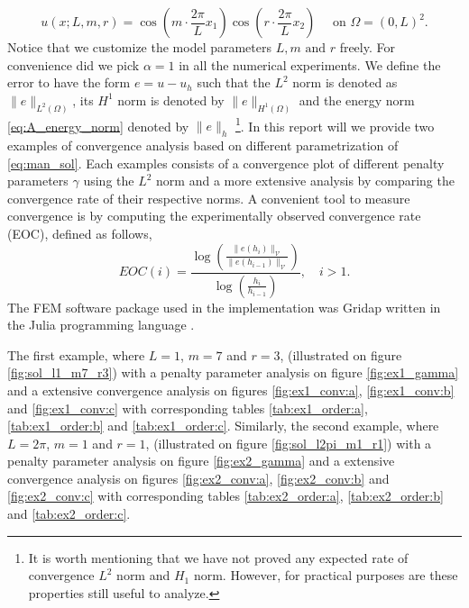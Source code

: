 \begin{equation}
    \label{eq:man_sol}
u\left( x; L,m,r \right) = \cos\left(  m\cdot \frac{2\pi}{L}  x_{1}\right)  \cos \left(r\cdot  \frac{2\pi}{L} x_{2} \right) \quad \text{ on }   \Omega =  \left( 0,L  \right)^{2}.
\end{equation}
Notice that we customize the model parameters $L, m \text{ and } r$ freely.
For convenience did we pick $\alpha = 1$ in all the numerical experiments. We define the error to have the form $e = u - u_{h}$ such that the $L^2$ norm is denoted as $\| e \|_{ L^{2}\left( \Omega  \right)   }^{  } $, its $H^{1} $ norm is denoted by $\|
e \|_{ H^{1}\left( \Omega  \right)  }^{  } $ and the energy norm  \eqref{eq:A_energy_norm} denoted by $\| e \|_{ h }^{  } $ \footnote{
It is worth mentioning that we have not proved any expected rate of convergence $L^2$ norm and $H_1$ norm. However, for practical purposes are these properties still useful to analyze.
}. In this report will we provide two examples of convergence analysis based on different
parametrization of \eqref{eq:man_sol}. Each examples consists of a convergence plot of different penalty parameters $\gamma$ using the $L^{2}$ norm and a more extensive analysis by comparing the convergence rate of their respective norms. A convenient tool to measure convergence is by computing the experimentally observed convergence rate (EOC), defined as follows,
\[
EOC(i) = \frac{\log\left( \frac{\| e\left( h_{i} \right)  \|_{ \mathcal{V}  }^{  }}{\| e\left( h_{i-1} \right) \|_{\mathcal{V}   }^{  } }   \right)}{\log\left( \frac{h_{i}}{h_{i-1}}  \right) }, \quad i>1   .
\]
The FEM software package used in the implementation was Gridap written in the Julia programming language \cite{verdugo22, julia17}.


The first example, where $L=1$, $m=7$ and $r=3$, (illustrated on figure \ref{fig:sol_l1_m7_r3}) with a penalty parameter analysis on figure \ref{fig:ex1_gamma} and a extensive convergence analysis on figures \ref{fig:ex1_conv:a}, \ref{fig:ex1_conv:b} and \ref{fig:ex1_conv:c} with
corresponding tables \ref{tab:ex1_order:a}, \ref{tab:ex1_order:b} and \ref{tab:ex1_order:c}. Similarly, the second example, where $L=2\pi$, $m=1$ and $r=1$, (illustrated on figure \ref{fig:sol_l2pi_m1_r1}) with a penalty parameter analysis on figure
\ref{fig:ex2_gamma} and a extensive convergence analysis on figures \ref{fig:ex2_conv:a},
\ref{fig:ex2_conv:b} and \ref{fig:ex2_conv:c} with corresponding tables \ref{tab:ex2_order:a}, \ref{tab:ex2_order:b} and \ref{tab:ex2_order:c}.

